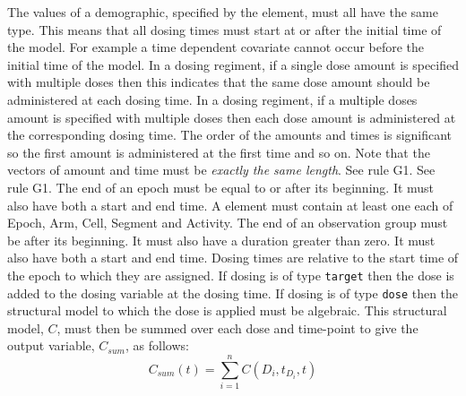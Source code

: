 \begin{valrules}
 The values of a demographic,
specified by the  element, must all have the same
type.
 This
means that all dosing times must start at or after the initial time of
the model.
 For example a time dependent covariate cannot occur
before the initial time of the model.
 In a
dosing regiment, if a single dose amount is specified with multiple
doses then this indicates that the same dose amount should be
administered at each dosing time.
 In a
dosing regiment, if a multiple doses amount is specified with multiple
doses then each dose amount is administered at the corresponding
dosing time. The order of the amounts and times is significant so the
first amount is administered at the first time and so on. Note that
the vectors of amount and time must be \emph{exactly the same length}.
 See rule G1.
 See rule G1.
 The end of an epoch
must be equal to or after its beginning. It must also have both a start and end time.
 A 
element must contain at least one each of Epoch, Arm, Cell, Segment
and Activity.
 The end
of an observation group must be after its beginning. It must also have
a duration greater than zero. It must also have both a start and end
time.
 Dosing times are
relative to the start time of the epoch to which they are assigned.
 If dosing is of type
\texttt{target} then the dose is added to the dosing variable at the
dosing time.
%
 If dosing is
of type \texttt{dose} then the structural model to which the dose is
applied must be algebraic. This structural model, $C$, must then be
summed over each dose and time-point to give the output variable,
$C_{\mathit{sum}}$, as follows:
%
\[
C_{\mathit{sum}}(t) = \sum_{i=1}^{n} C(D_i, t_{D_i}, t)
\]
\end{valrules}


